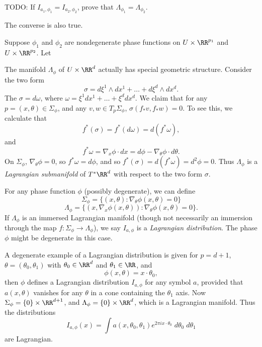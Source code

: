 
TODO: If $I_{a_1,\phi_1} = I_{a_2,\phi_2}$, prove that $\Lambda_{\phi_1} = \Lambda_{\phi_2}$.

The converse is also true.

\begin{theorem}
    Suppose $\phi_1$ and $\phi_2$ are nondegenerate phase functions on $U \times \RR^{p_1}$ and $U \times \RR^{p_2}$. Let 
\end{theorem}

The manifold $\Lambda_\phi$ of $U \times \RR^d$ actually has special geometric structure. Consider the two form
%
\[ \sigma = d\xi^1 \wedge dx^1 + \dots + d\xi^d \wedge dx^d. \]
%
The $\sigma = d\omega$, where $\omega = \xi^1 dx^1 + \dots + \xi^d dx^d$. We claim that for any $p =(x,\theta) \in \Sigma_\phi$, and any $v,w \in T_p \Sigma_\phi$, $\sigma(f_* v, f_* w) = 0$. To see this, we calculate that
%
\[ f^*(\sigma) = f^*(d \omega) = d(f^* \omega), \]
%
and
%
\[ f^* \omega = \nabla_x \phi \cdot dx = d \phi - \nabla_\theta \phi \cdot d\theta. \]
%
On $\Sigma_\phi$, $\nabla_\theta \phi = 0$, so $f^* \omega = d \phi$, and so $f^*(\sigma) = d(f^* \omega) = d^2 \phi = 0$. Thus $\Lambda_\phi$ is a \emph{Lagrangian submanifold} of $T^* \RR^d$ with respect to the two form $\sigma$.

For any phase function $\phi$ (possibly degenerate), we can define
%
\[ \Sigma_\phi = \{ (x,\theta): \nabla_\theta \phi(x,\theta) = 0 \} \]
%
\[ \Lambda_\phi = \{ (x,\nabla_x \phi(x,\theta)) : \nabla_\theta \phi(x,\theta) = 0 \}. \]
%
If $\Lambda_\phi$ is an immersed Lagrangian manifold (though not necessarily an immersion through the map $f: \Sigma_\phi \to \Lambda_\phi$), we say $I_{a,\phi}$ is a \emph{Lagrangian distribution}. The phase $\phi$ might be degenerate in this case.

\begin{example}
    A degenerate example of a Lagrangian distribution is given for $p = d + 1$, $\theta = (\theta_0, \theta_1)$ with $\theta_0 \in \RR^d$ and $\theta_1 \in \RR$, and
    \[ \phi(x,\theta) = x \cdot \theta_0, \]
    then $\phi$ defines a Lagrangian distribution $I_{a,\phi}$ for any symbol $a$, provided that $a(x,\theta)$ vanishes for any $\theta$ in a cone containing the $\theta_1$ axis. Now $\Sigma_\phi = \{ 0 \} \times \RR^{d+1}$, and $\Lambda_\phi = \{ 0 \} \times \RR^d$, which is a Lagrangian manifold. Thus the distributions
    \[ I_{a,\phi}(x) = \int a(x,\theta_0,\theta_1) e^{2 \pi i x \cdot \theta_0}\; d\theta_0\; d\theta_1 \]
    are Lagrangian.
\end{example}


